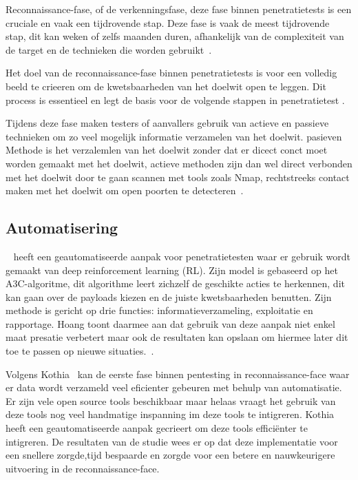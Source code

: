 Reconnaissance-fase, of de verkenningsfase, deze fase binnen penetratietests is een cruciale en vaak 
een tijdrovende stap. Deze fase is vaak de meest tijdrovende stap, dit kan weken of zelfs maanden 
duren, afhankelijk van de complexiteit van de target en de technieken die worden gebruikt~\autocite{Shah}. 

Het doel van de reconnaissance-fase binnen penetratietests is voor een volledig beeld te crieeren om de 
kwetsbaarheden van het doelwit open te leggen. Dit process is essentieel en legt de basis voor de
volgende stappen in penetratietest \autocite{Kothia}.

Tijdens deze fase maken testers of aanvallers gebruik van actieve en passieve technieken om zo veel
mogelijk informatie verzamelen van het doelwit. pasieven Methode is het verzalemlen van het doelwit 
zonder dat er dicect conct moet worden gemaakt met het doelwit, actieve methoden zijn dan wel direct
verbonden met het doelwit door te gaan scannen met tools zoals Nmap, rechtstreeks contact maken met 
het doelwit om open poorten te detecteren~\autocite{Shah}.

\subsection{Automatisering}

~\textcite{Hoang} heeft een geautomatiseerde aanpak voor penetratietesten waar er gebruik wordt gemaakt van deep reinforcement 
learning (RL). Zijn model is gebaseerd op het A3C-algoritme, dit algorithme leert zichzelf de geschikte acties te herkennen, dit kan 
gaan over de payloads kiezen en de juiste kwetsbaarheden benutten. Zijn  methode is gericht op drie functies: informatieverzameling, 
exploitatie en rapportage. Hoang toont daarmee aan dat gebruik van deze aanpak niet enkel maat presatie verbetert maar ook de resultaten 
kan opslaan om hiermee later dit toe te passen op nieuwe situaties.~\autocite{Hoang}.

Volgens Kothia~\textcite{Kothia} kan de eerste fase binnen pentesting in reconnaissance-face waar er data wordt verzameld veel 
eficienter gebeuren met behulp van automatisatie. Er zijn vele open source tools beschikbaar maar helaas vraagt het gebruik van deze 
tools nog veel handmatige inspanning im deze tools te intigreren. Kothia heeft een geautomatiseerde aanpak gecrieert om deze tools
efficiënter te intigreren. De resultaten van de studie wees er op dat deze implementatie voor een snellere zorgde,tijd 
bespaarde en zorgde voor een betere en nauwkeurigere uitvoering in de reconnaissance-face\autocite{Kothia}.


